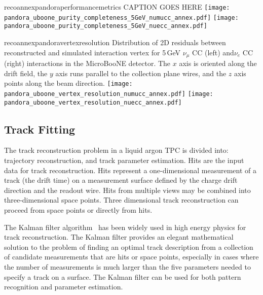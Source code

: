 \begin{cdrfigure}{recoannexpandoraperformancemetrics}
{CAPTION GOES HERE}
\texttt{[image: pandora\_uboone\_purity\_completeness\_5GeV\_numucc\_annex.pdf]}
\texttt{[image: pandora\_uboone\_purity\_completeness\_5GeV\_nuecc\_annex.pdf]}
\end{cdrfigure}

\begin{cdrfigure}{recoannexpandoravertexresolution}
{Distribution of 2D residuals between reconstructed and simulated interaction
 vertex for 5\,GeV $\nu_{\mu}$ CC (left) and$\nu_{e}$ CC (right) interactions in the MicroBooNE detector.
 The $x$ axis is oriented along the drift field, the $y$ axis runs parallel 
 to the collection plane wires, and the $z$ axis points along the beam direction.}
\texttt{[image: pandora\_uboone\_vertex\_resolution\_numucc\_annex.pdf]}
\texttt{[image: pandora\_uboone\_vertex\_resolution\_nuecc\_annex.pdf]}
\end{cdrfigure}


\subsection{Track Fitting}


The track reconstruction problem in a liquid argon TPC is divided
into: trajectory reconstruction, and track parameter estimation.
Hits are the input data for track reconstruction. Hits represent a
one-dimensional measurement of a track (the drift time) on a
measurement surface defined by the charge drift direction and the
readout wire. Hits from multiple views may be combined into
three-dimensional space points. Three dimensional track reconstruction
can proceed from space points or directly from hits.

The Kalman filter algorithm~\cite{kalman} has been widely used in high
energy physics for track reconstruction. The Kalman filter provides an
elegant mathematical solution to the problem of finding an optimal
track description from a collection of candidate measurements that are
hits or space points, especially in cases where the number of
measurements is much larger than the five parameters needed to specify
a track on a surface.  The Kalman filter can be used for both pattern
recognition and parameter estimation.


